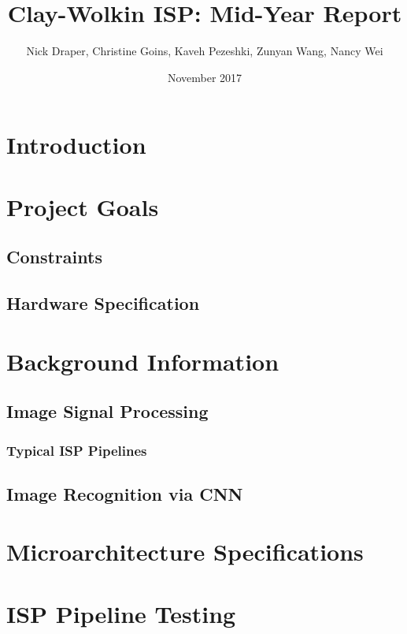 \documentclass{report}
\begin{document}
\title{Clay-Wolkin ISP: Mid-Year Report}
\author{Nick Draper, Christine Goins, Kaveh Pezeshki, Zunyan Wang, Nancy Wei}
\date{November 2017}
\maketitle

\tableofcontents
\listoffigures
\listoftables

\begin{abstract}
	\label{abstract}
\end{abstract}

\chapter{Introduction}

\chapter{Project Goals}
	\section{Constraints}
	\section{Hardware Specification}

\chapter{Background Information}
	\section{Image Signal Processing}
		\subsection{Typical ISP Pipelines}
	\section{Image Recognition via CNN}
	
\chapter{Microarchitecture Specifications}

\chapter{ISP Pipeline Testing}
\end{document}

